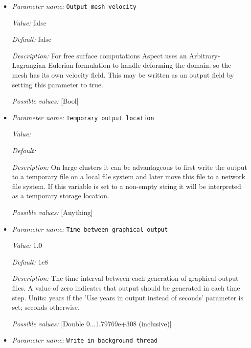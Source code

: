 \begin{itemize}
{\it Possible values:} [Selection none|dx|ucd|gnuplot|povray|eps|gmv|tecplot|tecplot_binary|vtk|vtu|hdf5|svg|deal.II intermediate ]
\item {\it Parameter name:} {\tt Output mesh velocity}
\label{parameters:Postprocess/Visualization/Output mesh velocity}


{\it Value:} false


{\it Default:} false


{\it Description:} For free surface computations Aspect uses an Arbitrary-Lagrangian-Eulerian formulation to handle deforming the domain, so the mesh has its own velocity field.  This may be written as an output field by setting this parameter to true.


{\it Possible values:} [Bool]
\item {\it Parameter name:} {\tt Temporary output location}
\label{parameters:Postprocess/Visualization/Temporary output location}


{\it Value:} 


{\it Default:} 


{\it Description:} On large clusters it can be advantageous to first write the output to a temporary file on a local file system and later move this file to a network file system. If this variable is set to a non-empty string it will be interpreted as a temporary storage location.


{\it Possible values:} [Anything]
\item {\it Parameter name:} {\tt Time between graphical output}
\label{parameters:Postprocess/Visualization/Time between graphical output}


{\it Value:} 1.0


{\it Default:} 1e8


{\it Description:} The time interval between each generation of graphical output files. A value of zero indicates that output should be generated in each time step. Units: years if the 'Use years in output instead of seconds' parameter is set; seconds otherwise.


{\it Possible values:} [Double 0...1.79769e+308 (inclusive)]
\item {\it Parameter name:} {\tt Write in background thread}
\label{parameters:Postprocess/Visualization/Write in background thread}



\end{itemize}
